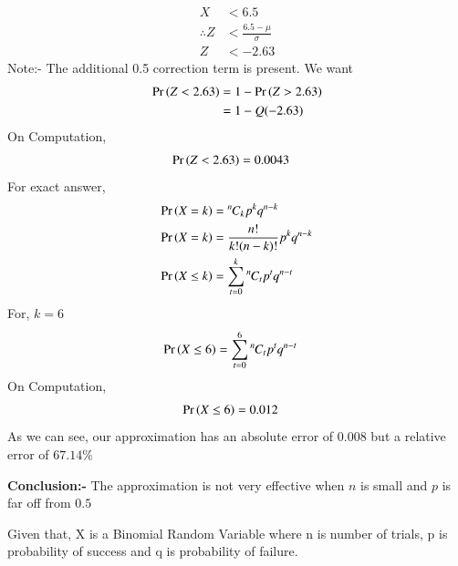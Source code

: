 \documentclass[journal,12pt,twocolumn]{IEEEtran}
\newcommand{\permcomb}[4][0mu]{{{}^{#3}\mkern#1#2_{#4}}}
\newcommand{\comb}[1][-1mu]{\permcomb[#1]{C}}
\begin{document}
\begin{align}
    X &< 6.5\\
    \therefore Z &< \frac{6.5-\mu}{\sigma}\\
    Z&<-2.63
\end{align}
Note:- The additional 0.5 correction term is present.
We want
\begin{align}
\Pr\left(Z<2.63\right) &= 1-\Pr\left(Z>2.63\right)\\
    &= 1- Q(-2.63)
\end{align}
On Computation,
\begin{align}
\Pr\left(Z<2.63\right) &= 0.0043
\end{align}
For exact answer,
\begin{align}
    \pr{X=k} &= \comb{n}{k}p^k q^{n-k}\\
    \pr{X = k} &= \frac{n!}{k!(n-k)!}p^kq^{n-k}\\
    \pr{X \le k} &= \sum_{t=0}^{k} \comb{n}{t}p^t q^{n-t}
\end{align}
For, $k=6$
\begin{align}
    \pr{X \le 6} &= \sum_{t=0}^{6} \comb{n}{t}p^t q^{n-t}
\end{align}
On Computation,
\begin{align}
    \Pr\left(X\le 6\right) &= 0.012
\end{align}
As we can see, our approximation has an absolute error of $0.008$ but a relative error of $67.14\%$

\textbf{Conclusion:-} The approximation is not very effective when $n$ is small and $p$ is far off from $0.5$

\newpage
Given that, X is a Binomial Random Variable where n is number of trials, p is probability of success and q is probability of failure.
\end{document}
